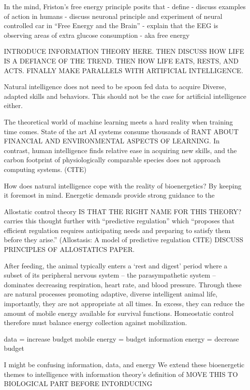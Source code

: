 In the mind, Friston’s free energy principle posits that 
- define
- discuss examples of action in humans
- discuss neuronal principle and experiment of neural controlled car in “Free Energy and the Brain”
- explain that the EEG is observing areas of extra glucose consumption - aka free energy



INTRODUCE INFORMATION THEORY HERE. THEN DISCUSS HOW LIFE IS A DEFIANCE OF THE TREND. THEN HOW LIFE EATS, RESTS, AND ACTS. FINALLY MAKE PARALLELS WITH ARTIFICIAL INTELLIGENCE. 

Natural intelligence does not need to be spoon fed data to acquire Diverse, adapted skills and behaviors. This should not be the case for artificial intelligence either. 

The theoretical world of machine learning meets a hard reality when training time comes. State of the art AI systems consume thousands of RANT ABOUT FINANCIAL AND ENVIRONMENTAL ASPECTS OF LEARNING. In contrast, human intelligence finds relative ease in acquiring new skills, and the carbon footprint of physiologically comparable species does not approach computing systems. (CITE) 

How does natural intelligence cope with the reality of bioenergetics? By keeping it foremost in mind. Energetic demands provide strong guidance to the

Allostatic control theory IS THAT THE RIGHT NAME FOR THIS THEORY?        carries this thought further with “predictive regulation” which “proposes that efficient regulation requires anticipating needs and preparing to satisfy them before they arise.” (Allostasis: A model of predictive regulation CITE) DISCUSS PRINCIPLES OF ALLOSTATICS PAPER.

After feeding, the animal typically enters a ‘rest and digest’ period where a subset of its peripheral nervous system -- the parasympathetic system -- dominates decreasing respiration, heart rate, and blood pressure. Through these are natural processes promoting adaptive, diverse intelligent animal life, importantly, they are not appropriate at all times. In excess, they can reduce the amount of mobile energy available for survival functions. Homeostatic control therefore must balance energy collection against mobilization.
 
data = increase budget
mobile energy = budget
information energy = decrease budget

I might be confusing information, data, and energy
We extend these bioenergetic themes to intelligence with information theory’s definition of MOVE THIS TO BIOLOGICAL PART BEFORE INTORDUCING 


